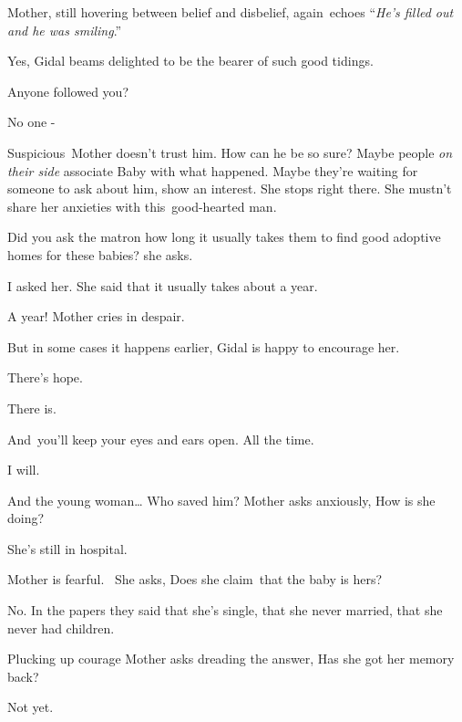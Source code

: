 \documentclass[letterpaper]{article}
\begin{document}
Mother, still hovering between belief and disbelief, again\textcolor[rgb]{0.0,0.4392157,0.7529412}{\ }echoes
``\textit{He's filled out and he was smiling}.'' 

{\textquotedbl}Yes,{\textquotedbl} Gidal beams delighted to be the bearer of such good tidings. 

{\textquotedbl}Anyone followed you?{\textquotedbl} 

{\textquotedbl}No one -{\textquotedbl} 

Suspicious\textcolor[rgb]{0.0,0.4392157,0.7529412}{\ }Mother doesn't trust him. How can he be so sure? Maybe people
\textit{on their side} associate Baby with what happened. Maybe they're waiting for someone to ask about him, show an
interest. She stops right there. She mustn't share her anxieties with this\ good{}-hearted man. 

{\textquotedbl}Did you ask the matron how long it usually takes them to find good adoptive homes for these
babies?{\textquotedbl} she asks.

{\textquotedbl}I asked her. She said that it usually takes about a year.{\textquotedbl} 

{\textquotedbl}A year!{\textquotedbl} Mother cries in despair. 

{\textquotedbl}But in some cases it happens earlier,{\textquotedbl} Gidal is happy to encourage her. 

{\textquotedbl}There's hope.{\textquotedbl} 

{\textquotedbl}There is.{\textquotedbl} 

{\textquotedbl}And~you'll keep your eyes and ears open. All the time.{\textquotedbl} 

{\textquotedbl}I will.{\textquotedbl} 

{\textquotedbl}And the young woman{\dots} Who saved him?{\textquotedbl} Mother asks anxiously, {\textquotedbl}How is she
doing?{\textquotedbl} 

{\textquotedbl}She's still in hospital.{\textquotedbl} 

Mother is fearful. \ She asks, {\textquotedbl}Does she claim\textcolor{red}{\ }that the baby is hers?{\textquotedbl} 

{\textquotedbl}No. In the papers they said that she's single, that she never married, that she never had
children.{\textquotedbl} 

Plucking up courage Mother asks dreading the answer, {\textquotedbl}Has she got her memory back?{\textquotedbl} 

{\textquotedbl}Not yet.{\textquotedbl} 
\end{document}
